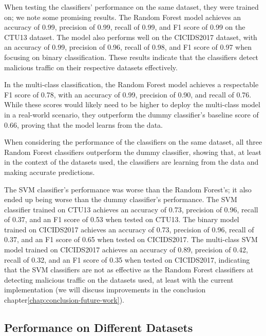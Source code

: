 When testing the classifiers' performance on the same dataset, they were trained on; we note some promising results. The Random Forest model achieves an accuracy of 0.99, precision of 0.99, recall of 0.99, and F1 score of 0.99 on the CTU13 dataset. The model also performs well on the CICIDS2017 dataset, with an accuracy of 0.99, precision of 0.96, recall of 0.98, and F1 score of 0.97 when focusing on binary classification. These results indicate that the classifiers detect malicious traffic on their respective datasets effectively.

In the multi-class classification, the Random Forest model achieves a respectable F1 score of 0.78, with an accuracy of 0.99, precision of 0.90, and recall of 0.76. While these scores would likely need to be higher to deploy the multi-class model in a real-world scenario, they outperform the dummy classifier's baseline score of 0.66, proving that the model learns from the data.

When considering the performance of the classifiers on the same dataset, all three Random Forest classifiers outperform the dummy classifier, showing that, at least in the context of the datasets used, the classifiers are learning from the data and making accurate predictions.

The SVM classifier's performance was worse than the Random Forest's; it also ended up being worse than the dummy classifier's performance. The SVM classifier trained on CTU13 achieves an accuracy of 0.73, precision of 0.96, recall of 0.37, and an F1 score of 0.53 when tested on CTU13. The binary model trained on CICIDS2017 achieves an accuracy of 0.73, precision of 0.96, recall of 0.37, and an F1 score of 0.65 when tested on CICIDS2017. The multi-class SVM model trained on CICIDS2017 achieves an accuracy of 0.89, precision of 0.42, recall of 0.32, and an F1 score of 0.35 when tested on CICIDS2017, indicating that the SVM classifiers are not as effective as the Random Forest classifiers at detecting malicious traffic on the datasets used, at least with the current implementation (we will discuss improvements in the conclusion chapter\ref{chap:conclusion-future-work}).

\subsection{Performance on Different Datasets}\label{subsec:performance-different-dataset}

